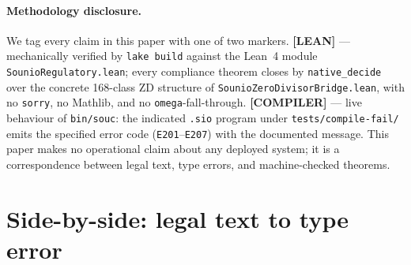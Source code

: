 \documentclass{article}
\begin{document}
\paragraph{Methodology disclosure.}
We tag every claim in this paper with one of two markers.
\textbf{[LEAN]} --- mechanically verified by \texttt{lake build} against
the Lean~4 module \texttt{SounioRegulatory.lean}; every compliance theorem
closes by \texttt{native\_decide} over the concrete 168-class ZD structure
of \texttt{SounioZeroDivisorBridge.lean}, with no \texttt{sorry}, no
Mathlib, and no \texttt{omega}-fall-through.
\textbf{[COMPILER]} --- live behaviour of \texttt{bin/souc}: the indicated
\texttt{.sio} program under \texttt{tests/compile-fail/} emits the specified
error code (\texttt{E201}--\texttt{E207}) with the documented message.
This paper makes no operational claim about any deployed system; it is a
correspondence between legal text, type errors, and machine-checked theorems.

\section{Side-by-side: legal text to type error}
\end{document}
